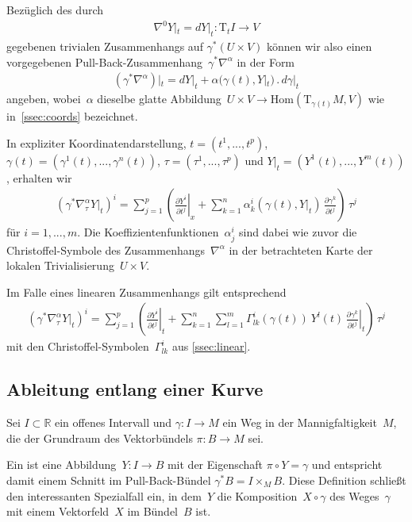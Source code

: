\documentclass[10pt,a4paper]{article}
\newcommand{\mydef}[1]{\textls{#1}}
\begin{document}
Bezüglich des durch
\begin{align*}
\nabla^0Y|_t = dY|_t: \mathrm{T}_tI \rightarrow V
\end{align*}
gegebenen trivialen Zusammenhangs auf $\gamma^*(U\times V)$ können wir also einen vorgegebenen Pull-Back-Zusammenhang~$\gamma^*\nabla^\alpha$ in der Form
\begin{align*}
(\gamma^*\nabla^\alpha)|_t = 
dY|_t 
+ \alpha(\gamma(t), Y|_t)\,.\,d\gamma|_t
\end{align*}
angeben, wobei~$\alpha$ dieselbe glatte Abbildung~$U \times V\rightarrow \mathrm{Hom}(\mathrm{T}_{\gamma(t)}M, V)$ wie in~\ref{ssec:coords} bezeichnet.

In expliziter Koordinatendarstellung, $t=(t^1, ..., t^p)$, $\gamma(t)=(\gamma^1(t), ..., \gamma^n(t))$, $\tau=(\tau^1, ..., \tau^p)$ und $Y|_t= (Y^1(t), ..., Y^m(t))$, erhalten wir
\begin{align}
\label{eq:pullback_coords}
\left(\gamma^*\nabla^\alpha_\tau Y|_t\right)^i
= \sum_{j=1}^p 
\left(
\left.
\frac{\partial Y^i}{\partial t^j}
\right|_x
+ \sum_{k=1}^n 
\alpha^i_k(\gamma(t), Y|_t)\,\frac{\partial\gamma^k}{\partial t^j}
\right)\,\tau^j
\end{align}
für $i=1, ...,m$.
Die Koeffizienten\-funktionen~$\alpha^i_j$ sind dabei wie zuvor die Christoffel-Symbole des Zusammenhangs~$\nabla^\alpha$ in der betrachteten Karte der lokalen Trivialisierung~$U\times V$.

Im Falle eines linearen Zusammenhangs gilt entsprechend
\begin{align}
\label{eq:pullback_coords_lin}
\left(\gamma^*\nabla^\alpha_\tau Y|_t\right)^i
= \sum_{j=1}^p 
\left(
\left.
\frac{\partial Y^i}{\partial t^j}
\right|_t
+ \sum_{k=1}^n\sum_{l=1}^m 
\Gamma^i_{lk}(\gamma(t))\ Y^l(t)\, 
\left.\frac{\partial\gamma^k}{\partial t^j}\right|_t
\right)\,\tau^j
\end{align}
mit den Christoffel-Symbolen~$\Gamma^i_{lk}$ aus \ref{ssec:linear}.

\subsection{Ableitung entlang einer Kurve}
\label{ssec:covariant_derivative}

Sei $I\subset\mathbb{R}$ ein offenes Intervall und $\gamma:I\rightarrow M$ ein Weg in der Mannigfaltigkeit~$M$, die der Grundraum des Vektorbündels $\pi:B\rightarrow M$ sei.

Ein \mydef{Vektorfeld längs~$\gamma$} ist eine Abbildung~$Y:I\rightarrow B$ mit der Eigenschaft $\pi\circ Y=\gamma$ und entspricht damit einem Schnitt im Pull-Back-Bündel $\gamma^*B=I\times_M B$.
Diese Definition schließt den interessanten Spezialfall ein, in dem~$Y$ die Komposition~$X\circ\gamma$ des Weges~$\gamma$ mit einem Vektorfeld~$X$ im Bündel~$B$ ist.\\
\end{document}
